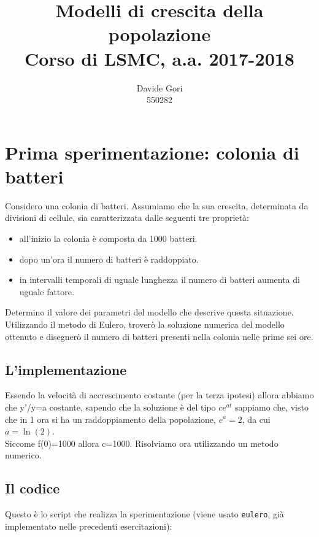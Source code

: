 \documentclass{article}
\title{Modelli di crescita della popolazione\\
	Corso di LSMC, a.a. 2017-2018}
\author{Davide Gori\\
	550282}
\begin{document}
	\maketitle
	\section{Prima sperimentazione: colonia di batteri}
	Considero una colonia di batteri. Assumiamo che la sua crescita, determinata da divisioni di cellule, sia caratterizzata dalle seguenti tre proprietà:
	\begin{itemize}
		\item all’inizio la colonia è composta da 1000 batteri.
		\item dopo un’ora il numero di batteri è raddoppiato.
		\item in intervalli temporali di uguale lunghezza il numero di batteri aumenta di uguale fattore.
	\end{itemize}
	Determino il valore dei parametri del modello che descrive questa situazione. \\
	Utilizzando il metodo di Eulero, troverò la soluzione numerica del modello ottenuto e disegnerò il numero di batteri presenti nella colonia nelle prime sei ore.
	
	\subsection{L'implementazione}
	Essendo la velocità di accrescimento costante (per la terza ipotesi) allora abbiamo che y'/y=a costante, sapendo che la soluzione è del tipo $c e^{at}$ sappiamo che, visto che in 1 ora si ha un raddoppiamento della popolazione, $e^a=2$, da cui $a=\ln(2)$.\\
	Siccome f(0)=1000 allora c=1000. Risolviamo ora utilizzando un metodo numerico.
	\subsection{Il codice}
	Questo è lo script che realizza la sperimentazione (viene usato {\tt eulero}, già implementato nelle precedenti esercitazioni):
	
\end{document}
